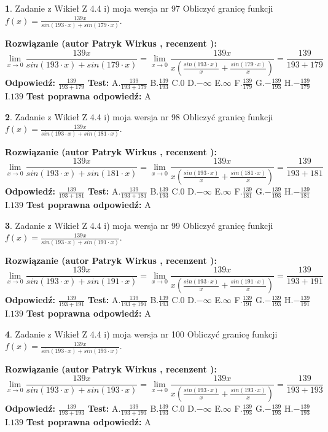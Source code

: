 \documentclass[12pt, a4paper]{article}
\theoremstyle{definition} %
\newtheorem{zad}{}
\newcommand{\zadStart}[1]{\begin{zad}#1\newline}
\newcommand{\zadStop}{\end{zad}}
\newcommand{\rozwStart}[2]{\noindent \textbf{Rozwiązanie (autor #1 , recenzent #2): }\newline}
\newcommand{\rozwStop}{\newline}
\newcommand{\odpStart}{\noindent \textbf{Odpowiedź:}\newline}
\newcommand{\odpStop}{\newline}
\newcommand{\testStart}{\noindent \textbf{Test:}\newline}
\newcommand{\testStop}{\newline}
\newcommand{\kluczStart}{\noindent \textbf{Test poprawna odpowiedź:}\newline}
\newcommand{\kluczStop}{\newline}
\begin{document}
\zadStart{Zadanie z Wikieł Z 4.4 i) moja wersja nr 97}
Obliczyć granicę funkcji $f(x)=\frac{139x}{sin(193\cdot x) +sin(179\cdot x)}$.
\zadStop
\rozwStart{Patryk Wirkus}{}
$$\lim\limits_{x\to 0}\frac{139x}{sin(193\cdot x) +sin(179\cdot x)}=\lim\limits_{x\to 0}\frac{139x}{x(\frac{sin(193\cdot x)}{x}+\frac{sin(179\cdot x)}{x})}=\frac{139}{193+179}$$
\rozwStop
\odpStart
$\frac{139}{193+179}$
\odpStop
\testStart
A.$\frac{139}{193+179}$
B.$\frac{139}{193}$
C.$0$
D.$-\infty$
E.$\infty$
F.$\frac{139}{179}$
G.$-\frac{139}{193}$
H.$-\frac{139}{179}$
I.$139$
\testStop
\kluczStart
A
\kluczStop



\zadStart{Zadanie z Wikieł Z 4.4 i) moja wersja nr 98}
Obliczyć granicę funkcji $f(x)=\frac{139x}{sin(193\cdot x) +sin(181\cdot x)}$.
\zadStop
\rozwStart{Patryk Wirkus}{}
$$\lim\limits_{x\to 0}\frac{139x}{sin(193\cdot x) +sin(181\cdot x)}=\lim\limits_{x\to 0}\frac{139x}{x(\frac{sin(193\cdot x)}{x}+\frac{sin(181\cdot x)}{x})}=\frac{139}{193+181}$$
\rozwStop
\odpStart
$\frac{139}{193+181}$
\odpStop
\testStart
A.$\frac{139}{193+181}$
B.$\frac{139}{193}$
C.$0$
D.$-\infty$
E.$\infty$
F.$\frac{139}{181}$
G.$-\frac{139}{193}$
H.$-\frac{139}{181}$
I.$139$
\testStop
\kluczStart
A
\kluczStop



\zadStart{Zadanie z Wikieł Z 4.4 i) moja wersja nr 99}
Obliczyć granicę funkcji $f(x)=\frac{139x}{sin(193\cdot x) +sin(191\cdot x)}$.
\zadStop
\rozwStart{Patryk Wirkus}{}
$$\lim\limits_{x\to 0}\frac{139x}{sin(193\cdot x) +sin(191\cdot x)}=\lim\limits_{x\to 0}\frac{139x}{x(\frac{sin(193\cdot x)}{x}+\frac{sin(191\cdot x)}{x})}=\frac{139}{193+191}$$
\rozwStop
\odpStart
$\frac{139}{193+191}$
\odpStop
\testStart
A.$\frac{139}{193+191}$
B.$\frac{139}{193}$
C.$0$
D.$-\infty$
E.$\infty$
F.$\frac{139}{191}$
G.$-\frac{139}{193}$
H.$-\frac{139}{191}$
I.$139$
\testStop
\kluczStart
A
\kluczStop



\zadStart{Zadanie z Wikieł Z 4.4 i) moja wersja nr 100}
Obliczyć granicę funkcji $f(x)=\frac{139x}{sin(193\cdot x) +sin(193\cdot x)}$.
\zadStop
\rozwStart{Patryk Wirkus}{}
$$\lim\limits_{x\to 0}\frac{139x}{sin(193\cdot x) +sin(193\cdot x)}=\lim\limits_{x\to 0}\frac{139x}{x(\frac{sin(193\cdot x)}{x}+\frac{sin(193\cdot x)}{x})}=\frac{139}{193+193}$$
\rozwStop
\odpStart
$\frac{139}{193+193}$
\odpStop
\testStart
A.$\frac{139}{193+193}$
B.$\frac{139}{193}$
C.$0$
D.$-\infty$
E.$\infty$
F.$\frac{139}{193}$
G.$-\frac{139}{193}$
H.$-\frac{139}{193}$
I.$139$
\testStop
\kluczStart
A
\kluczStop
\end{document}
